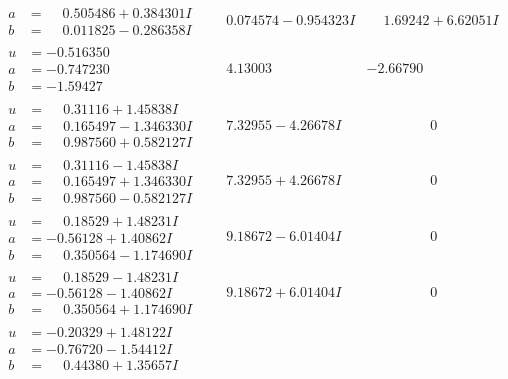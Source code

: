 \documentclass[1p]{elsarticle_modified}
\theoremstyle{definition}
\begin{document}
$$\begin{array}{c|c|c}
\begin{aligned}
a &= \phantom{-}0.505486 + 0.384301 I \\
b &= \phantom{-}0.011825 - 0.286358 I\end{aligned}
 & \phantom{-}0.074574 - 0.954323 I & \phantom{-}1.69242 + 6.62051 I \\ \hline\begin{aligned}
u &= -0.516350\phantom{ +0.000000I} \\
a &= -0.747230\phantom{ +0.000000I} \\
b &= -1.59427\phantom{ +0.000000I}\end{aligned}
 & \phantom{-}4.13003\phantom{ +0.000000I} & -2.66790\phantom{ +0.000000I} \\ \hline\begin{aligned}
u &= \phantom{-}0.31116 + 1.45838 I \\
a &= \phantom{-}0.165497 - 1.346330 I \\
b &= \phantom{-}0.987560 + 0.582127 I\end{aligned}
 & \phantom{-}7.32955 - 4.26678 I & \phantom{-0.000000 } 0 \\ \hline\begin{aligned}
u &= \phantom{-}0.31116 - 1.45838 I \\
a &= \phantom{-}0.165497 + 1.346330 I \\
b &= \phantom{-}0.987560 - 0.582127 I\end{aligned}
 & \phantom{-}7.32955 + 4.26678 I & \phantom{-0.000000 } 0 \\ \hline\begin{aligned}
u &= \phantom{-}0.18529 + 1.48231 I \\
a &= -0.56128 + 1.40862 I \\
b &= \phantom{-}0.350564 - 1.174690 I\end{aligned}
 & \phantom{-}9.18672 - 6.01404 I & \phantom{-0.000000 } 0 \\ \hline\begin{aligned}
u &= \phantom{-}0.18529 - 1.48231 I \\
a &= -0.56128 - 1.40862 I \\
b &= \phantom{-}0.350564 + 1.174690 I\end{aligned}
 & \phantom{-}9.18672 + 6.01404 I & \phantom{-0.000000 } 0 \\ \hline\begin{aligned}
u &= -0.20329 + 1.48122 I \\
a &= -0.76720 - 1.54412 I \\
b &= \phantom{-}0.44380 + 1.35657 I\end{aligned}

\end{array}$$
\end{document}
